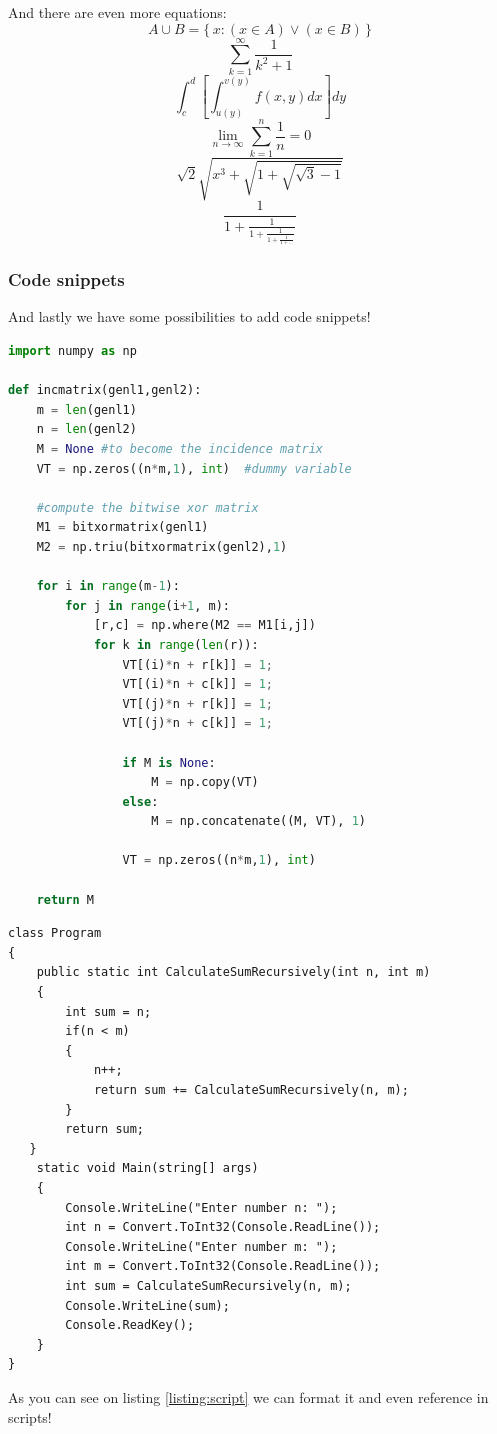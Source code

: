And there are even more equations:
$$A \cup B = \{\, x \colon (x \in A) \vee (x \in B)\,\}$$
$$\sum_{k=1}^{\infty}\frac{1}{k^2+1}$$
$$\int_{c}^{d} \left[ \int_{u(y)}^{v(y)} f(x,y)dx \right] dy$$
$$\lim_{n \to \infty} \sum_{k = 1}^n \frac{1}{n} = 0$$
$$\sqrt{2}\sqrt{x^3 + \sqrt{1 + \sqrt{\sqrt{3}-1}}}$$
$$\frac{1}{1 + \frac{1}{1 + \frac{1}{1 + \frac{1}{1 + \dots}}}}$$

\subsubsection{Code snippets}
\label{label:code_title}

And lastly we have some possibilities to add code snippets! %
\begin{lstlisting}[language=Python]
import numpy as np
    
def incmatrix(genl1,genl2):
    m = len(genl1)
    n = len(genl2)
    M = None #to become the incidence matrix
    VT = np.zeros((n*m,1), int)  #dummy variable
    
    #compute the bitwise xor matrix
    M1 = bitxormatrix(genl1)
    M2 = np.triu(bitxormatrix(genl2),1) 

    for i in range(m-1):
        for j in range(i+1, m):
            [r,c] = np.where(M2 == M1[i,j])
            for k in range(len(r)):
                VT[(i)*n + r[k]] = 1;
                VT[(i)*n + c[k]] = 1;
                VT[(j)*n + r[k]] = 1;
                VT[(j)*n + c[k]] = 1;
                
                if M is None:
                    M = np.copy(VT)
                else:
                    M = np.concatenate((M, VT), 1)
                
                VT = np.zeros((n*m,1), int)
    
    return M
\end{lstlisting}

\begin{lstlisting}[language={[Sharp]C}, caption={C\# exaple}, label={listing:script}]
class Program
{
    public static int CalculateSumRecursively(int n, int m)
    {
        int sum = n;
        if(n < m)
        {
            n++;
            return sum += CalculateSumRecursively(n, m);
        }
        return sum;
   }
    static void Main(string[] args)
    {
        Console.WriteLine("Enter number n: ");
        int n = Convert.ToInt32(Console.ReadLine());
        Console.WriteLine("Enter number m: ");
        int m = Convert.ToInt32(Console.ReadLine());
        int sum = CalculateSumRecursively(n, m);
        Console.WriteLine(sum);
        Console.ReadKey();
    }
}
\end{lstlisting}

As {\color{red}you} can see on listing \ref{listing:script} we can format it and even reference in scripts!
